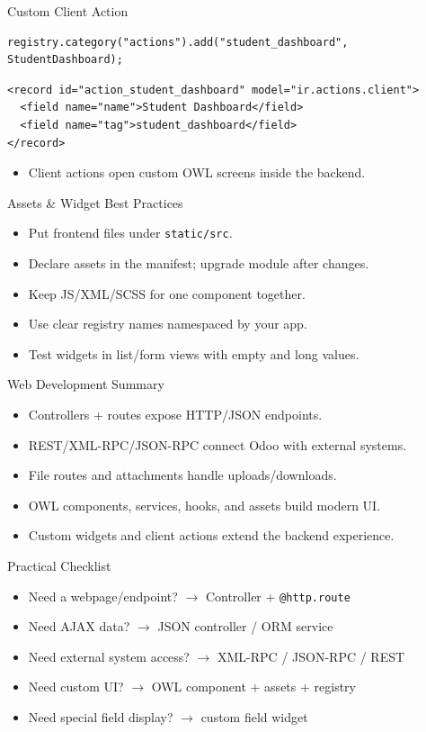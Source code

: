 \begin{frame}[fragile]{Custom Client Action}
\begin{lstlisting}[style=js]
registry.category("actions").add("student_dashboard", StudentDashboard);
\end{lstlisting}
\begin{lstlisting}[style=xml]
<record id="action_student_dashboard" model="ir.actions.client">
  <field name="name">Student Dashboard</field>
  <field name="tag">student_dashboard</field>
</record>
\end{lstlisting}
	\begin{itemize}
		\item Client actions open custom OWL screens inside the backend.
	\end{itemize}
\end{frame}

\begin{frame}{Assets \& Widget Best Practices}
	\begin{itemize}
		\item Put frontend files under \texttt{static/src}.
		\item Declare assets in the manifest; upgrade module after changes.
		\item Keep JS/XML/SCSS for one component together.
		\item Use clear registry names namespaced by your app.
		\item Test widgets in list/form views with empty and long values.
	\end{itemize}
\end{frame}

\begin{frame}{Web Development Summary}
	\begin{itemize}
		\item Controllers + routes expose HTTP/JSON endpoints.
		\item REST/XML-RPC/JSON-RPC connect Odoo with external systems.
		\item File routes and attachments handle uploads/downloads.
		\item OWL components, services, hooks, and assets build modern UI.
		\item Custom widgets and client actions extend the backend experience.
	\end{itemize}
\end{frame}

\begin{frame}{Practical Checklist}
	\begin{itemize}
		\item Need a webpage/endpoint? $\rightarrow$ Controller + \texttt{@http.route}
		\item Need AJAX data? $\rightarrow$ JSON controller / ORM service
		\item Need external system access? $\rightarrow$ XML-RPC / JSON-RPC / REST
		\item Need custom UI? $\rightarrow$ OWL component + assets + registry
		\item Need special field display? $\rightarrow$ custom field widget
	\end{itemize}
\end{frame}
